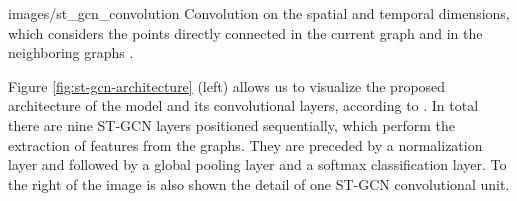 
    {images/st_gcn_convolution}
    {Convolution on the spatial and temporal dimensions, which considers the points directly connected in the current graph and in the neighboring graphs \cite[p. 3]{st-gcn-2018}.}



Figure \ref{fig:st-gcn-architecture} (left) allows us to visualize the proposed architecture of the model and its convolutional layers, according to \cite{st-gcn-2018}. In total there are nine ST-GCN layers positioned sequentially, which perform the extraction of features from the graphs. They are preceded by a normalization layer and followed by a global pooling layer and a softmax classification layer. To the right of the image is also shown the detail of one ST-GCN convolutional unit.


